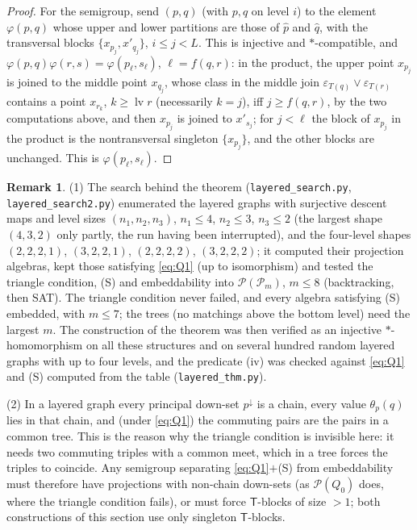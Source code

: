 \documentclass[11pt]{amsart}
\theoremstyle{definition}
\newtheorem{remark}[theorem]{Remark}
\renewcommand{\P}{\mathcal{P}}
\newcommand{\T}{\mathsf{T}}
\begin{document}
\begin{proof}
For the semigroup, send $(p,q)$ (with $p,q$ on level $i$) to the element $\varphi(p,q)$ whose upper and lower partitions are those of $\hat p$ and $\hat q$, with the transversal blocks $\{x_{p_j},x'_{q_j}\}$, $i\le j<L$. This is injective and $*$-compatible, and $\varphi(p,q)\varphi(r,s)=\varphi(p_\ell,s_\ell)$, $\ell=f(q,r)$: in the product, the upper point $x_{p_j}$ is joined to the middle point $x_{q_j}$, whose class in the middle join $\varepsilon_{T(q)}\vee\varepsilon_{T(r)}$ contains a point $x_{r_k}$, $k\ge\operatorname{lv}r$ (necessarily $k=j$), iff $j\ge f(q,r)$, by the two computations above, and then $x_{p_j}$ is joined to $x'_{s_j}$; for $j<\ell$ the block of $x_{p_j}$ in the product is the nontransversal singleton $\{x_{p_j}\}$, and the other blocks are unchanged. This is $\varphi(p_\ell,s_\ell)$.
\end{proof}

\begin{remark}\label{rem:layered}
(1) The search behind the theorem (\texttt{layered\_search.py}, \texttt{layered\_search2.py}) enumerated the layered graphs with surjective descent maps and level sizes $(n_1,n_2,n_3)$, $n_1\le4$, $n_2\le3$, $n_3\le2$ (the largest shape $(4,3,2)$ only partly, the run having been interrupted), and the four-level shapes $(2,2,2,1)$, $(3,2,2,1)$, $(2,2,2,2)$, $(3,2,2,2)$; it computed their projection algebras, kept those satisfying \eqref{eq:Q1} (up to isomorphism) and tested the triangle condition, (S) and embeddability into $\P(\P_m)$, $m\le8$ (backtracking, then SAT). The triangle condition never failed, and every algebra satisfying (S) embedded, with $m\le7$; the trees (no matchings above the bottom level) need the largest $m$. The construction of the theorem was then verified as an injective $*$-homomorphism on all these structures and on several hundred random layered graphs with up to four levels, and the predicate (iv) was checked against \eqref{eq:Q1} and (S) computed from the table (\texttt{layered\_thm.py}).

(2) In a layered graph every principal down-set $p^{\downarrow}$ is a chain, every value $\theta_p(q)$ lies in that chain, and (under \eqref{eq:Q1}) the commuting pairs are the pairs in a common tree. This is the reason why the triangle condition is invisible here: it needs two commuting triples with a common meet, which in a tree forces the triples to coincide. Any semigroup separating \eqref{eq:Q1}$+$(S) from embeddability must therefore have projections with non-chain down-sets (as $\P(Q_0)$ does, where the triangle condition fails), or must force $\T$-blocks of size $>1$; both constructions of this section use only singleton $\T$-blocks.
\end{remark}
\end{document}
